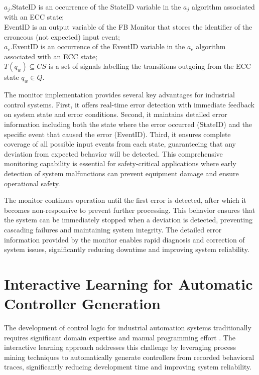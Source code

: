 \begin{algorithm}[T]
$a_j$.StateID is an occurrence of the  StateID  variable in the $a_j$ algorithm  associated with an ECC state;   \\

EventID is an  output variable of the FB Monitor that stores the identifier of the erroneous (not expected) input event; \\

$a_e$.EventID is an  occurrence of the EventID variable in the $a_e$ algorithm associated with an ECC state; \\

$T(q_w) \subseteq CS$ is a set of signals labelling the transitions outgoing from the ECC state $q_w \in Q$.

\end{algorithm}

The monitor implementation provides several key advantages for industrial control systems. First, it offers real-time error detection with immediate feedback on system state and error conditions. Second, it maintains detailed error information including both the state where the error occurred (StateID) and the specific event that caused the error (EventID). Third, it ensures complete coverage of all possible input events from each state, guaranteeing that any deviation from expected behavior will be detected. This comprehensive monitoring capability is essential for safety-critical applications where early detection of system malfunctions can prevent equipment damage and ensure operational safety.

The monitor continues operation until the first error is detected, after which it becomes non-responsive to prevent further processing. This behavior ensures that the system can be immediately stopped when a deviation is detected, preventing cascading failures and maintaining system integrity. The detailed error information provided by the monitor enables rapid diagnosis and correction of system issues, significantly reducing downtime and improving system reliability.

\section{Interactive Learning for Automatic Controller Generation}

The development of control logic for industrial automation systems traditionally requires significant domain expertise and manual programming effort \cite{lewis2001modelling}. The interactive learning approach addresses this challenge by leveraging process mining techniques to automatically generate controllers from recorded behavioral traces, significantly reducing development time and improving system reliability.

